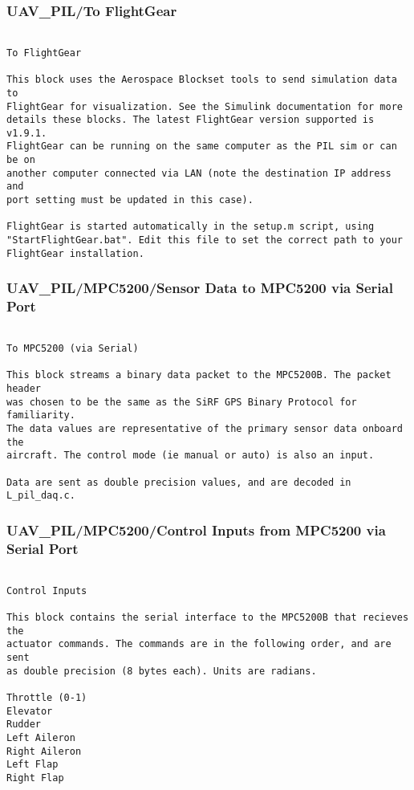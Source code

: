 \documentclass[12pt]{article}
\begin{document}
\subsubsection{UAV\_PIL/To FlightGear}
\begin{verbatim}

To FlightGear

This block uses the Aerospace Blockset tools to send simulation data to
FlightGear for visualization. See the Simulink documentation for more
details these blocks. The latest FlightGear version supported is v1.9.1.
FlightGear can be running on the same computer as the PIL sim or can be on
another computer connected via LAN (note the destination IP address and
port setting must be updated in this case).

FlightGear is started automatically in the setup.m script, using 
"StartFlightGear.bat". Edit this file to set the correct path to your
FlightGear installation.

\end{verbatim}

\subsubsection{UAV\_PIL/MPC5200/Sensor Data
to MPC5200 
via Serial Port}
\begin{verbatim}

To MPC5200 (via Serial)

This block streams a binary data packet to the MPC5200B. The packet header
was chosen to be the same as the SiRF GPS Binary Protocol for familiarity.
The data values are representative of the primary sensor data onboard the
aircraft. The control mode (ie manual or auto) is also an input.

Data are sent as double precision values, and are decoded in L_pil_daq.c.

\end{verbatim}

\subsubsection{UAV\_PIL/MPC5200/Control Inputs
from MPC5200
via Serial Port}
\begin{verbatim}

Control Inputs

This block contains the serial interface to the MPC5200B that recieves the 
actuator commands. The commands are in the following order, and are sent
as double precision (8 bytes each). Units are radians.

Throttle (0-1)
Elevator
Rudder
Left Aileron
Right Aileron
Left Flap
Right Flap


\end{verbatim}
\end{document}
